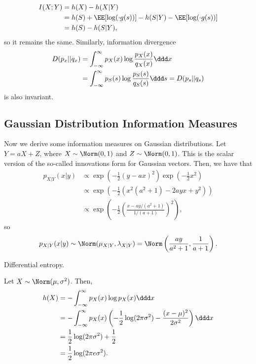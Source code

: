 \begin{align*}
	I(X;Y) &= h(X) - h(X|Y) \\
				 &= h(S) + \EE[\log (\cdot{g}(s))] - h(S|Y) - \EE[\log (\cdot {g}(s))] \\
				 &= h(S) - h(S|Y),
\end{align*}
so it remains the same. Similarly, information divergence 
\begin{align*}
	D(p_x||q_x) &= \int_{-\infty}^{\infty}p_X(x)\log \frac{p_X(x)}{q_X(x)} \ddd x \\
					&= \int_{-\infty}^{\infty}p_S(s)\log \frac{p_S(s)}{q_S(s)} \ddd s = D(p_s||q_s) 
\end{align*}
is also invariant. 

\subsection{Gaussian Distribution Information Measures}

Now we derive some information measures on Gaussian distributions. Let $Y = aX + Z$, where $X\sim \Norm(0,1)$ and $Z\sim \Norm(0,1)$. This is the scalar version of the so-called \ac{innovations form} for Gaussian vectors. Then, we have that 
\begin{align*}
	p_{X|Y}(x|y) &\propto \exp \left(-\frac{1}{2}(y-ax)^2\right)\exp \left(-\frac{1}{2}x^2\right) \\
							 &\propto \exp \left(-\frac{1}{2} \left(x^2(a^2+1) - 2ayx + y^2\right)\right) \\
							 &\propto \exp \left(-\frac{1}{2} \left(\frac{x - ay/(a^2+1)}{1/(a+1)}\right)^2\right),
\end{align*}
so 
\[p_{X|Y}(x|y) \sim \Norm(\mu_{X|Y}, \lambda_{X|Y}) = \Norm\left(\frac{ay}{a^2+1}, \frac{1}{a+1}\right).\] 

\begin{example}
\exlabel

Differential entropy.
\end{example}

Let $X\sim \Norm(\mu, \sigma^2)$. Then,
\begin{align*}
	h(X) &= -\int_{-\infty}^{\infty}p_X(x)\log p_X(x) \ddd x\\
			 &= -\int_{-\infty}^{\infty}p_X(x)\left(-\frac{1}{2}\log(2\pi\sigma^2)-\frac{(x-\mu)^2}{2\sigma^2}\right)\ddd x \\
			 &= \frac{1}{2}\log(2\pi\sigma^2) + \frac{1}{2} \\
			 &= \frac{1}{2}\log(2\pi e\sigma^2).
\end{align*}

